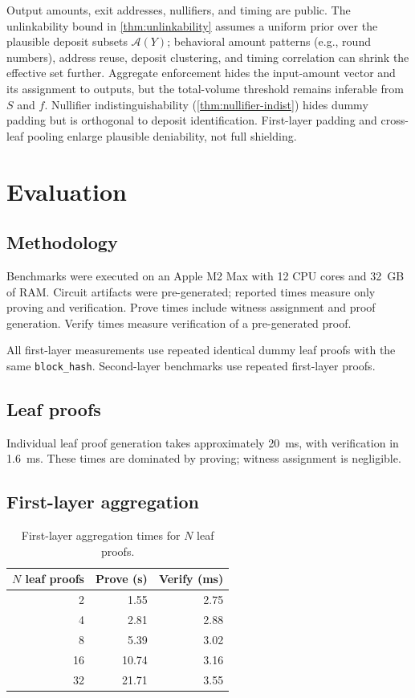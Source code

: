 \documentclass{iacrcc}
\begin{document}
Output amounts, exit addresses, nullifiers, and timing are public. The unlinkability bound in \cref{thm:unlinkability} assumes a uniform prior over the plausible deposit subsets \(\mathcal{A}(Y)\); behavioral amount patterns (e.g., round numbers), address reuse, deposit clustering, and timing correlation can shrink the effective set further. Aggregate enforcement hides the input-amount vector and its assignment to outputs, but the total-volume threshold remains inferable from \(S\) and \(f\). Nullifier indistinguishability (\cref{thm:nullifier-indist}) hides dummy padding but is orthogonal to deposit identification. First-layer padding and cross-leaf pooling enlarge plausible deniability, not full shielding.

\section{Evaluation}
\label{sec:evaluation}

\subsection{Methodology}

Benchmarks were executed on an Apple M2 Max with 12 CPU cores and 32~GB of RAM. Circuit artifacts were pre-generated; reported times measure only proving and verification. Prove times include witness assignment and proof generation. Verify times measure verification of a pre-generated proof.

All first-layer measurements use repeated identical dummy leaf proofs with the same \texttt{block\_hash}. Second-layer benchmarks use repeated first-layer proofs.

\subsection{Leaf proofs}

Individual leaf proof generation takes approximately 20~ms, with verification in 1.6~ms. These times are dominated by proving; witness assignment is negligible.

\subsection{First-layer aggregation}

\begin{table}[t]
\centering
\small
\begin{tabular}{@{}rrr@{}}
\toprule
\(N\) leaf proofs & Prove (s) & Verify (ms) \\
\midrule
2  & 1.55 & 2.75 \\
4  & 2.81 & 2.88 \\
8  & 5.39 & 3.02 \\
16 & 10.74 & 3.16 \\
32 & 21.71 & 3.55 \\
\bottomrule
\end{tabular}
\caption{First-layer aggregation times for \(N\) leaf proofs.}
\label{tab:layer0-results}
\end{table}
\end{document}
